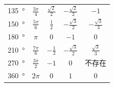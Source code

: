 \begin{table}[H]
\begin{tabular}{ S[table-format=3] c c c c }
        \midrule
        \SI{135}{\degree}                                     & $\frac{3\pi}{4}$ & $\frac{\sqrt{2}}{2}$ & $-\frac{\sqrt{2}}{2}$ & $-1$                  \\
        \SI{150}{\degree}                                     & $\frac{5\pi}{6}$ & $\frac{1}{2}$        & $-\frac{\sqrt{3}}{2}$ & $-\frac{\sqrt{3}}{3}$ \\
        \SI{180}{\degree}                                     & $\pi$            & $0$                  & $-1$                  & $0$                   \\
        \SI{210}{\degree}                                     & $\frac{7\pi}{6}$ & $-\frac{1}{2}$       & $-\frac{\sqrt{3}}{2}$ & $\frac{\sqrt{3}}{3}$  \\
        \SI{270}{\degree}                                     & $\frac{3\pi}{2}$ & $-1$                 & $0$                   & 不存在                   \\
        \SI{360}{\degree}                                     & $2\pi$           & $0$                  & $1$                   & $0$                   \\
        \bottomrule
    \end{tabular}
\end{table}